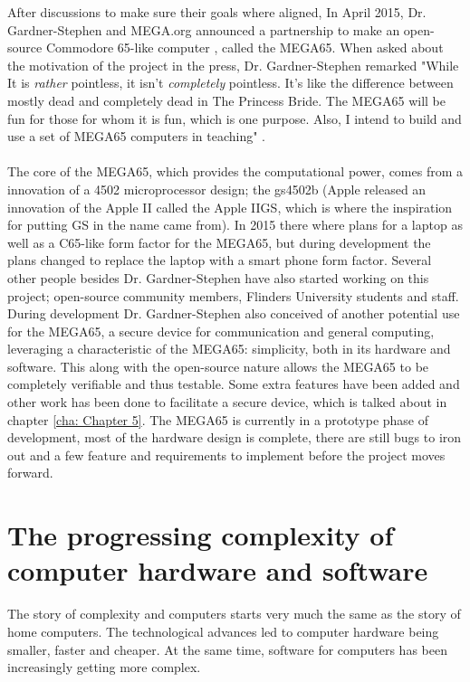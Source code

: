 After discussions to make sure their goals where aligned, In April 2015, Dr. Gardner-Stephen and MEGA.org announced a partnership to make an open-source Commodore 65-like computer 
\cite{RN47}, called the MEGA65. When asked about the motivation of the project in the press, Dr. Gardner-Stephen remarked "While It is \textit{rather} pointless, it isn't \textit{completely} pointless. It's like the difference between mostly dead and completely dead in The Princess Bride.  The MEGA65 will be fun for those for whom it is fun, which is one purpose.  Also, I intend to build and use a set of MEGA65 computers in teaching" 
\cite{RN48}.  \\\\
The core of  the MEGA65, which provides the computational power, comes from a innovation of a 4502 microprocessor design; the gs4502b (Apple released an innovation of the Apple II called the Apple IIGS, which is where the inspiration for putting GS in the name came from). In 2015 there where plans for a laptop as well as a C65-like form factor for the MEGA65, but during development the plans changed to replace the laptop with a smart phone form factor. Several other people besides Dr. Gardner-Stephen have also started working on this project; open-source community members, Flinders University students and staff. During development Dr. Gardner-Stephen also conceived of another potential use for the MEGA65, a secure device for communication and general computing, leveraging a characteristic of the MEGA65: simplicity, both in its hardware and software. This along with the open-source nature allows the MEGA65 to be completely verifiable and thus testable. Some extra features have been added and other work has been done to facilitate a secure device, which is talked about in chapter \ref{cha: Chapter 5}. The MEGA65 is currently in a prototype phase of development, most of the hardware design is complete, there are still bugs to iron out and a few feature and requirements to implement before the project moves forward.

\section{The progressing complexity of computer hardware and software}
The story of complexity and computers starts very much the same as the story of home computers. The technological advances led to computer hardware being smaller, faster and cheaper. At the same time, software for computers has been increasingly getting more complex. 

